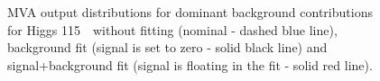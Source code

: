 \begin{figure}[!hbtp]
\caption{
MVA output distributions for dominant background contributions for
Higgs 115~\GeV\ without fitting (nominal - dashed blue line),
background fit (signal is set to zero - solid black line) and
signal+background fit (signal is floating in the fit - solid red
line).}
\label{fig:bdt2_115}
\end{figure}

